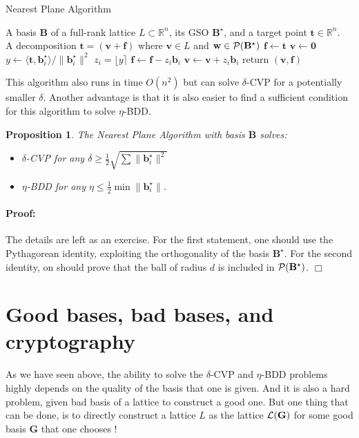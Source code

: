\documentclass[12pt]{article}
\renewcommand{\vec}{\mathbf}
\newcommand{\ps}[2]{\langle {#1}, {#2} \rangle}
\newcommand{\R}{\mathbb R}
\newtheorem{proposition}[theorem]{Proposition}{\bfseries}{\upshape}
\newenvironment{proof}{\paragraph{Proof:} }{\hfill\qed\\}
\newcommand{\qed}{\hfill \ensuremath{\Box}}
\begin{document}
\begin{algorithm}
\caption{Nearest Plane Algorithm}
\label{alg:BabaiNearestPlane}
\begin{algorithmic}[1]
    \REQUIRE A basis $\vec B$ of a full-rank lattice $L \subset \R^n$, its GSO $\vec B^\star$, and a target point $\vec t \in \R^n$. \\
    \ENSURE A decomposition $\vec t = (\vec v + \vec f)$ where $\vec v \in L$ and $\vec w \in \cP(\vec B^\star)$
    \STATE $\vec f \gets \vec t$
    \STATE $\vec v \gets \vec 0$
    \STATE $y \gets \ps{\vec t}{\vec b^\star_i} / \|\vec b^\star_i\|^2$
    \STATE $z_i = \lfloor y \rceil$
    \STATE $\vec f \gets \vec f - z_i \vec b_i$
    \STATE $\vec v \gets \vec v + z_i \vec b_i$
  \ENDFOR
\STATE return $(\vec v,\vec f)$
  \end{algorithmic}
\end{algorithm}

This algorithm also runs in time $O(n^2)$ but can solve $\delta$-CVP for a potentially smaller $\delta$. Another advantage is that it is also easier to find a sufficient condition for this algorithm to solve $\eta$-BDD.

\begin{proposition}
\label{prop:npa}
  The Nearest Plane Algorithm with basis $\vec B$ solves:
  \begin{itemize}
    \item $\delta$-CVP for any $\delta \geq \frac 1 2 \sqrt {\sum \| \vec b_i^\star \|^2}$
    \item $\eta$-BDD for any $\eta \leq \frac 1 2 \min \| \vec b^\star_i \|$.
  \end{itemize}
\end{proposition}
\begin{proof}
The details are left as an exercise. For the first statement, one should use the Pythagorean identity, exploiting the orthogonality of the basis $\vec B^\star$. For the second identity, on should prove that the ball of radius $d$ is included in $\cP(\vec B^\star)$.
\end{proof}

\section{Good bases, bad bases, and cryptography}

As we have seen above, the ability to solve the $\delta$-CVP and $\eta$-BDD problems highly depends on the quality of the basis that one is given. And it is also a hard problem, given bad basis of a lattice to construct a good one. But one thing that can be done, is to directly construct a lattice $L$ as the lattice $\cL(\vec G)$ for some good basis $\vec G$ that one chooses !
\end{document}

